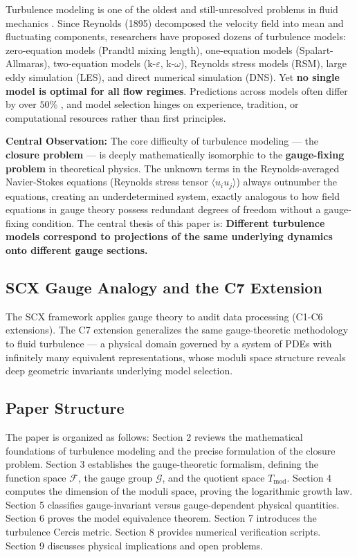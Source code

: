\documentclass[12pt,a4paper]{article}
\theoremstyle{plain}
\theoremstyle{definition}
\theoremstyle{remark}
\newcommand{\F}{\mathcal{F}}
\newcommand{\G}{\mathcal{G}}
\newcommand{\Tmod}{T_{\text{mod}}}
\newcommand{\avg}[1]{\langle #1 \rangle}
\begin{document}
Turbulence modeling is one of the oldest and still-unresolved problems in fluid mechanics \cite{pope2000}. Since Reynolds (1895) decomposed the velocity field into mean and fluctuating components, researchers have proposed dozens of turbulence models: zero-equation models (Prandtl mixing length), one-equation models (Spalart-Allmaras), two-equation models (k-$\varepsilon$, k-$\omega$), Reynolds stress models (RSM), large eddy simulation (LES), and direct numerical simulation (DNS). Yet \textbf{no single model is optimal for all flow regimes}. Predictions across models often differ by over $50\%$ \cite{wilcox2006}, and model selection hinges on experience, tradition, or computational resources rather than first principles.

\textbf{Central Observation:} The core difficulty of turbulence modeling --- the \textbf{closure problem} --- is deeply mathematically isomorphic to the \textbf{gauge-fixing problem} in theoretical physics. The unknown terms in the Reynolds-averaged Navier-Stokes equations (Reynolds stress tensor $\avg{u_i u_j}$) always outnumber the equations, creating an underdetermined system, exactly analogous to how field equations in gauge theory possess redundant degrees of freedom without a gauge-fixing condition. The central thesis of this paper is: \textbf{Different turbulence models correspond to projections of the same underlying dynamics onto different gauge sections.}

\subsection{SCX Gauge Analogy and the C7 Extension}

The SCX framework \cite{scx_gauge} applies gauge theory to audit data processing (C1-C6 extensions). The C7 extension generalizes the same gauge-theoretic methodology to fluid turbulence --- a physical domain governed by a system of PDEs with infinitely many equivalent representations, whose moduli space structure reveals deep geometric invariants underlying model selection.

\subsection{Paper Structure}

The paper is organized as follows: Section 2 reviews the mathematical foundations of turbulence modeling and the precise formulation of the closure problem. Section 3 establishes the gauge-theoretic formalism, defining the function space $\F$, the gauge group $\G$, and the quotient space $\Tmod$. Section 4 computes the dimension of the moduli space, proving the logarithmic growth law. Section 5 classifies gauge-invariant versus gauge-dependent physical quantities. Section 6 proves the model equivalence theorem. Section 7 introduces the turbulence Cercis metric. Section 8 provides numerical verification scripts. Section 9 discusses physical implications and open problems.
\end{document}
